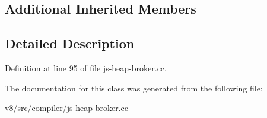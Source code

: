 \subsection*{Additional Inherited Members}


\subsection{Detailed Description}


Definition at line 95 of file js-\/heap-\/broker.\+cc.



The documentation for this class was generated from the following file\+:\begin{DoxyCompactItemize}
\item 
v8/src/compiler/js-\/heap-\/broker.\+cc\end{DoxyCompactItemize}
